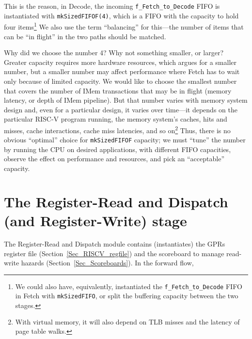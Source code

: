 This is the reason, in Decode, the incoming \verb|f_Fetch_to_Decode|
FIFO is instantiated with \verb|mkSizedFIFOF(4)|, which is a FIFO with
the capacity to hold four items\footnote{We could also have,
equivalently, instantiated the {\tt f\_Fetch\_to\_Decode} FIFO in
Fetch with {\tt mkSizedFIFO}, or split the buffering capacity between
the two stages.}  We also use the term ``balancing'' for this---the
number of items that can be ``in flight'' in the two paths should be
matched.

Why did we choose the number 4?  Why not something smaller, or larger?
Greater capacity requires more hardware resources, which argues for a
smaller number, but a smaller number may affect performance where
Fetch has to wait only because of limited capacity.  We would like to
choose the smallest number that covers the number of IMem transactions
that may be in flight (memory latency, or depth of IMem pipeline).
But that number varies with memory system design and, even for a
particular design, it varies over time---it depends on the particular
RISC-V program running, the memory system's caches, hits and misses,
cache interactions, cache miss latencies, and so on\footnote{With
virtual memory, it will also depend on TLB misses and the latency of
page table walks.}  Thus, there is no obvious ``optimal'' choice for
\verb|mkSizedFIFOF| capacity; we must ``tune'' the number by running
the CPU on desired applications, with different FIFO capacities,
observe the effect on performance and resources, and pick an
``acceptable'' capacity.


\section{The Register-Read and Dispatch (and Register-Write) stage}

\label{Sec_Fife_RR_RW_stage}

The Register-Read and Dispatch module contains (instantiates) the GPRs
register file (Section~\ref{Sec_RISCV_regfile}) and the scoreboard to
manage read-write hazards (Section~\ref{Sec_Scoreboards}).  In the
forward flow,

